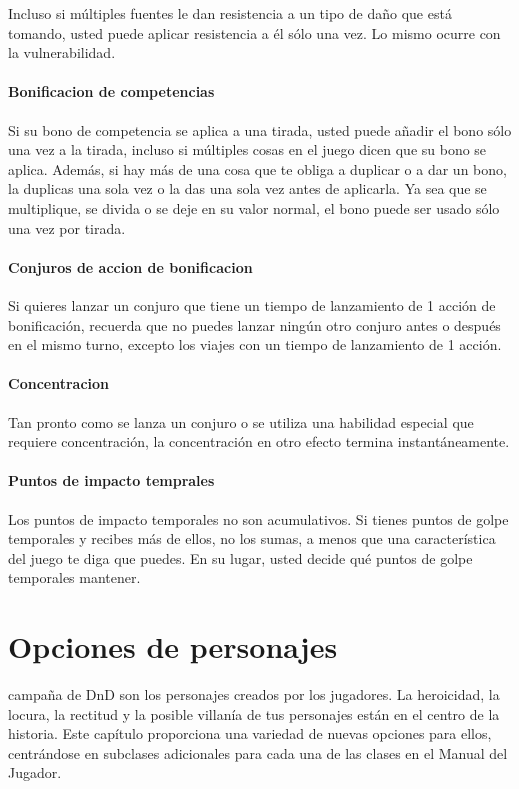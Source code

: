 \documentclass[a4paper,twocolumn,openany,10pt]{dndbook}
\begin{document}
Incluso si múltiples fuentes le dan resistencia a un tipo de daño que está tomando, usted puede aplicar resistencia a él sólo una
vez. Lo mismo ocurre con la vulnerabilidad.

\subsubsection{Bonificacion de competencias}
Si su bono de competencia se aplica a una tirada, usted puede añadir el bono sólo una vez a la tirada, incluso si múltiples cosas
en el juego dicen que su bono se aplica. Además, si hay más de una cosa que te obliga a duplicar o a dar un bono, la duplicas una
sola vez o la das una sola vez antes de aplicarla. Ya sea que se multiplique, se divida o se deje en su valor normal, el bono
puede ser usado sólo una vez por tirada.

\subsubsection{Conjuros de accion de bonificacion}
Si quieres lanzar un conjuro que tiene un tiempo de lanzamiento de 1 acción de bonificación, recuerda que no puedes lanzar ningún
otro conjuro antes o después en el mismo turno, excepto los viajes con un tiempo de lanzamiento de 1 acción.

\subsubsection{Concentracion}
Tan pronto como se lanza un conjuro o se utiliza una habilidad especial que requiere concentración, la concentración en otro
efecto termina instantáneamente.

\subsubsection{Puntos de impacto temprales}
Los puntos de impacto temporales no son acumulativos. Si tienes puntos de golpe temporales y recibes más de ellos, no los sumas,
a menos que una característica del juego te diga que puedes. En su lugar, usted decide qué puntos de golpe temporales mantener.

\newpage

\chapter{Opciones de personajes}

 campaña de DnD son los personajes creados por los jugadores. La
heroicidad, la locura, la rectitud y la posible villanía de tus personajes están en el centro de la historia. Este capítulo
proporciona una variedad de nuevas opciones para ellos, centrándose en subclases adicionales para cada una de las clases en el
Manual del Jugador.
\end{document}
